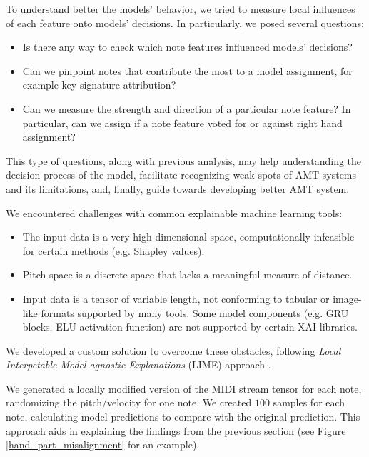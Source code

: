 To understand better the models' behavior, we tried to measure local influences of each feature onto models' decisions. In particularly, we posed several questions:

\begin{itemize}
	\item Is there any way to check which note features influenced models' decisions?
	\item Can we pinpoint notes that contribute the most to a model assignment, for example key signature attribution?
	\item Can we measure the strength and direction of a particular note feature? In particular, can we assign if a note feature voted for or against right hand assignment?
\end{itemize}

This type of questions, along with previous analysis, may help understanding the decision process of the model, facilitate recognizing weak spots of AMT systems and its limitations, and, finally, guide towards developing better AMT system.

We encountered challenges with common explainable machine learning tools: 

\begin{itemize}
	\item The input data is a very high-dimensional space, computationally infeasible for certain methods (e.g. Shapley values).
	\item Pitch space is a discrete space that lacks a meaningful measure of distance.
	\item Input data is a tensor of variable length, not conforming to tabular or image-like formats supported by many tools. Some model components (e.g. GRU blocks, ELU activation function) are not supported by certain XAI libraries. \missing
\end{itemize} 

We developed a custom solution to overcome these obstacles, following \emph{Local Interpetable Model-agnostic Explanations} (LIME) approach \cite{Ribeiro2016}.

We generated a locally modified version of the MIDI stream tensor for each note, randomizing the pitch/velocity for one note. We created $100$ samples for each note, calculating model predictions to compare with the original prediction. This approach aids in explaining the findings from the previous section (see Figure \ref{hand_part_misalignment} for an example).

